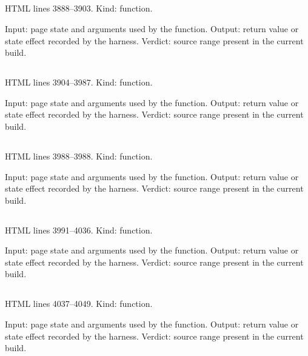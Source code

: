 \subsection*{\texttt{}}
\label{vf_135_integrityEvents}
HTML lines 3888--3903. Kind: function.

Input: page state and arguments used by the function.
Output: return value or state effect recorded by the harness.
Verdict: source range present in the current build.

\subsection*{\texttt{}}
\label{vf_136_edsEvents}
HTML lines 3904--3987. Kind: function.

Input: page state and arguments used by the function.
Output: return value or state effect recorded by the harness.
Verdict: source range present in the current build.

\subsection*{\texttt{}}
\label{vf_137_ec}
HTML lines 3988--3988. Kind: function.

Input: page state and arguments used by the function.
Output: return value or state effect recorded by the harness.
Verdict: source range present in the current build.

\subsection*{\texttt{}}
\label{vf_138_edsRecordTables}
HTML lines 3991--4036. Kind: function.

Input: page state and arguments used by the function.
Output: return value or state effect recorded by the harness.
Verdict: source range present in the current build.

\subsection*{\texttt{}}
\label{vf_139_drawTemperatureTrace}
HTML lines 4037--4049. Kind: function.

Input: page state and arguments used by the function.
Output: return value or state effect recorded by the harness.
Verdict: source range present in the current build.

